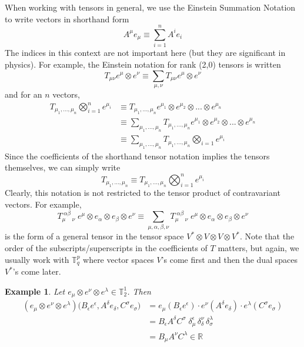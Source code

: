 \documentclass{article}
\newtheorem{example}{Example}[section]
\theoremstyle{remark}
\theoremstyle{definition}
\begin{document}
When working with tensors in general, we use the Einstein Summation Notation to write vectors in shorthand form
\[ A^{\mu} e_{\mu} \equiv \sum_{i=1}^{n} A^{i} e_{i}\]
The indices in this context are not important here (but they are significant in physics). For example, the Einstein notation for rank (2,0) tensors is written
\[ T_{\mu \nu} e^{\mu} \otimes e^{\nu} \equiv \sum_{\mu, \nu} T_{\mu \nu} e^{\mu} \otimes e^{\nu}\]
and for an $n$ vectors, 
\begin{align*}
T_{\mu_{1}, ..., \mu_{n}} \bigotimes_{i=1}^{n} e^{\mu_{i}} & \equiv T_{\mu_{1}, ..., \mu_{n}} e^{\mu_{1}} \otimes e^{\mu_{2}} \otimes ... \otimes e^{\mu_{n}} \\
     & \equiv \sum_{\mu_{1}, ..., \mu_{n}} T_{\mu_{1}, ..., \mu_{n}} e^{\mu_{1}} \otimes e^{\mu_{2}} \otimes ... \otimes e^{\mu_{n}} \\
     & \equiv \sum_{\mu_{1}, ..., \mu_{n}} T_{\mu_{1}, ..., \mu_{n}} \bigotimes_{i=1} e^{\mu_{i}}
\end{align*}
Since the coefficients of the shorthand tensor notation implies the tensors themselves, we can simply write
\[ T_{\mu_{1}, ..., \mu_{n}} \equiv T_{\mu_{1}, ..., \mu_{n}} \bigotimes_{i=1}^{n} e^{\mu_{i}} \]
Clearly, this notation is not restricted to the tensor product of contravariant vectors. For example,
\[T_{\mu \;\;\;\;\nu}^{\; \alpha \beta} \; e^{\mu} \otimes e_{\alpha} \otimes e_{\beta} \otimes e^{\nu}  \equiv \sum_{\mu, \alpha, \beta, \nu} T_{\mu \;\;\;\; \nu}^{\; \alpha \beta} \; e^{\mu} \otimes e_{\alpha} \otimes e_{\beta} \otimes e^{\nu}\]
is the form of a general tensor in the tensor space $V^* \otimes V \otimes V \otimes V^*$. Note that the order of the subscripts/superscripts in the coefficients of $T$ matters, but again, we usually work with $\mathbb{T}^p_q$ where vector spaces $V$'s come first and then the dual spaces $V^*$'s come later. 

\begin{example}
Let $e_{\mu} \otimes e^{\nu} \otimes e^{\lambda} \in \mathbb{T}^{1}_{2}$. Then 
\begin{align*}
(e_{\mu} \otimes e^{\nu} \otimes e^{\lambda}) \big( B_{\epsilon} e ^{\epsilon}, A^{\delta} e_{\delta}, C^{\sigma} e_{\sigma} \big) & = e_{\mu} (B_{\epsilon} e^{\epsilon}) \cdot e^{\nu} (A^{\delta} e_{\delta}) \cdot e^{\lambda} (C^\sigma e_{\sigma}) \\
 & = B_{\epsilon} A^{\delta} C^{\sigma} \; \delta_{\mu}^{\epsilon} \, \delta_{\delta}^{\nu} \, \delta_{\sigma}^{\lambda} \\
 & = B_{\mu} A^{\nu} C^{\lambda} \in \mathbb{R} 
 \end{align*}
\end{example}
\end{document}
